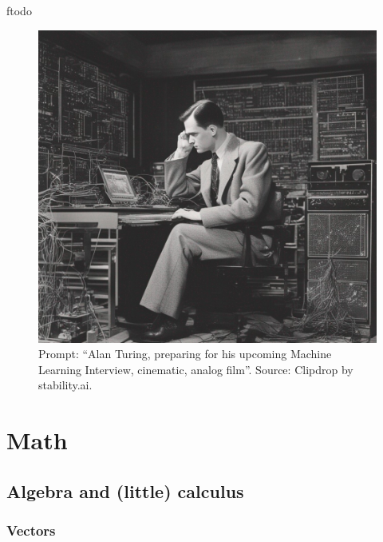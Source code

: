 ƒtodo\documentclass{article}
\begin{document}
\newpage

\begin{figure}[t!]
    \centering
    \includegraphics[width=0.9\linewidth]{img/turing_2.jpg}
    \caption{Prompt: ``Alan Turing, preparing for his upcoming Machine Learning Interview, cinematic, analog film''. Source: Clipdrop by stability.ai.}
    \label{fig:enter-label}
\end{figure}

\newpage

\clearpage %

\section{Math}
\subsection{Algebra and (little) calculus}
\subsubsection{Vectors}
\end{document}
